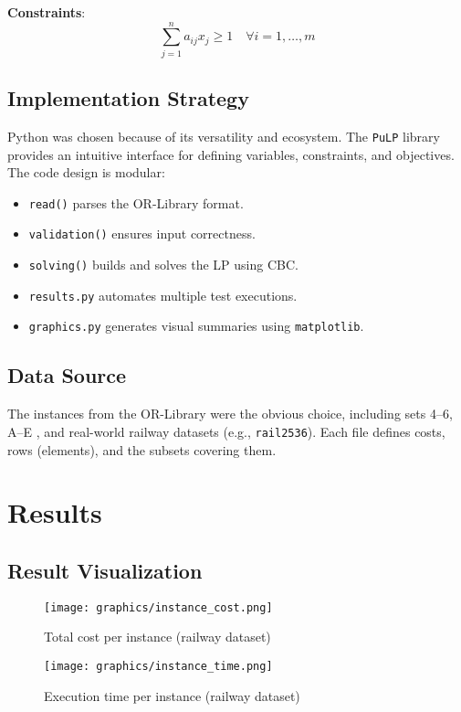 \documentclass[11pt,letterpaper]{article}
\begin{document}
\textbf{Constraints}:
\[
\sum_{j=1}^{n} a_{ij} x_j \geq 1 \quad \forall i = 1, \dots, m
\]

\subsection*{Implementation Strategy}
Python was chosen because of its versatility and ecosystem. The \texttt{PuLP} library provides an intuitive interface for defining variables, constraints, and objectives. The code design is modular:
\begin{itemize}
\item \texttt{read()} parses the OR-Library format.
\item \texttt{validation()} ensures input correctness.
\item \texttt{solving()} builds and solves the LP using CBC.
\item \texttt{results.py} automates multiple test executions.
\item \texttt{graphics.py} generates visual summaries using \texttt{matplotlib}.
\end{itemize}

\subsection*{Data Source}
The instances from the OR-Library were the obvious choice, including sets 4--6, A--E \cite{orlib}, and real-world railway datasets (e.g., \texttt{rail2536}). Each file defines costs, rows (elements), and the subsets covering them.

\section*{Results}

\subsection*{Result Visualization}

\begin{figure}[H]
\centering
\texttt{[image: graphics/instance\_cost.png]}
\caption{Total cost per instance (railway dataset)}
\end{figure}

\begin{figure}[H]
\centering
\texttt{[image: graphics/instance\_time.png]}
\caption{Execution time per instance (railway dataset)}
\end{figure}
\end{document}
